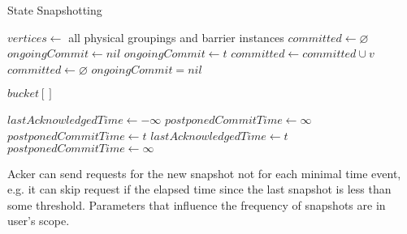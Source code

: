 \begin{algorithm}
{\fontsize{10pt}{10pt}\selectfont
\caption{State Snapshotting}
\label{state-snapshoting}
  \begin{algorithmic}
      \State $vertices \gets$ all physical groupings and barrier instances
      \State $committed \gets \varnothing$
      \State $ongoingCommit \gets nil$
      \State
         
            \State {}
          \EndFor
          \State $ongoingCommit \gets t$
        \EndIf
      \EndEvent
        \State $committed \gets committed \cup v$
          \State {} 
          \State $committed \gets \varnothing$
          \State $ongoingCommit = nil$
        \EndIf
      \EndEvent
    \EndProcess

      \State $bucket[]$ 
      \State
        \State {} 
        \State {}
        \State {}
      \EndEvent
    \EndProcess

      \State $lastAcknowledgedTime \gets -\infty$ 
      \State $postponedCommitTime \gets \infty$
      \State
          \State {}
        \Else
          \State $postponedCommitTime \gets t$
        \EndIf
      \EndEvent
        \State $lastAcknowledgedTime \gets t$
          \State {}
          \State $postponedCommitTime \gets \infty$
        \EndIf
      \EndEvent
    \EndProcess
  \end{algorithmic}
}
\end{algorithm}

Acker can send requests for the new snapshot not for each minimal time event, e.g. it can skip request if the elapsed time since the last snapshot is less than some threshold. Parameters that influence the frequency of snapshots are in user's scope.

